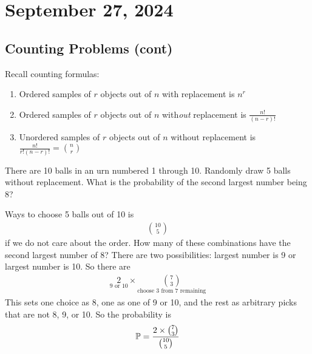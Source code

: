 \section{September 27, 2024}

\subsection{Counting Problems (cont)}
Recall counting formulas:
\begin{enumerate}
    \item Ordered samples of $r$ objects out of $n$ with replacement is $n^r$
    \item Ordered samples of $r$ objects out of $n$ with\textit{out} replacement is $\frac{n!}{(n-r)!}$
    \item Unordered samples of $r$ objects out of $n$ without replacement is $\frac{n!}{r!(n-r)!} = \binom{n}{r}$
\end{enumerate}
\begin{example}
    There are 10 balls in an urn numbered 1 through 10. Randomly draw 5 balls without replacement. What is the probability of the second largest number being 8?
    \begin{solution}
        Ways to choose 5 balls out of 10 is
        \begin{align}
            \binom{10}{5}
        \end{align}
        if we do not care about the order. How many of these combinations have the second largest number of 8? There are two possibilities: largest number is 9 or largest number is 10. So there are
        \begin{align}
            \underset{9 \text{ or } 10}{2} \times \underset{\text{choose 3 from 7 remaining}}{\binom{7}{3}}
        \end{align}
        This sets one choice as 8, one as one of 9 or 10, and the rest as arbitrary picks that are not 8, 9, or 10. So the probability is
        \begin{align}
            \mathbb{P} = \dfrac{2 \times \binom{7}{3}}{\binom{10}{5}}
        \end{align}
    \end{solution}
\end{example}
